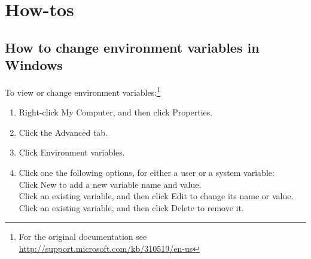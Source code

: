 \appendix
\chapter{How-tos}
\section{How to change environment variables in Windows}\label{app:change_env_var}
To view or change environment variables:\footnote{For the original documentation see \url{http://support.microsoft.com/kb/310519/en-us}}
\begin{enumerate}
	\item Right-click My Computer, and then click Properties.
	\item Click the Advanced tab.
	\item Click Environment variables.
	\item Click one the following options, for either a user or a system variable:\\
		Click New to add a new variable name and value.\\
		Click an existing variable, and then click Edit to change its name or value.\\
		Click an existing variable, and then click Delete to remove it.
\end{enumerate}

